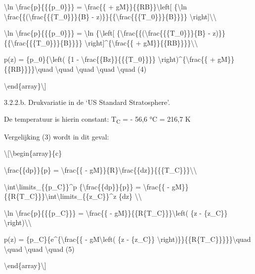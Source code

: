 \documentclass[]{article}
\begin{document}
\textbackslash{}ln \textbackslash{}frac\{p\}\{\{\{p\_0\}\}\} =
\textbackslash{}frac\{\{ + gM\}\}\{\{RB\}\}\textbackslash{}left{[}
\{\textbackslash{}ln
\textbackslash{}frac\{\{(\textbackslash{}frac\{\{\{T\_0\}\}\}\{B\} -
z)\}\}\{\{\textbackslash{}frac\{\{\{T\_0\}\}\}\{B\}\}\}\}
\textbackslash{}right{]}\textbackslash{}\textbackslash{}

\textbackslash{}ln \textbackslash{}frac\{p\}\{\{\{p\_0\}\}\} =
\textbackslash{}ln \{\textbackslash{}left{[}
\{\textbackslash{}frac\{\{(\textbackslash{}frac\{\{\{T\_0\}\}\}\{B\} -
z)\}\}\{\{\textbackslash{}frac\{\{\{T\_0\}\}\}\{B\}\}\}\}
\textbackslash{}right{]}\^{}\{\textbackslash{}frac\{\{ +
gM\}\}\{\{RB\}\}\}\}\textbackslash{}\textbackslash{}

p(z) = \{p\_0\}\{\textbackslash{}left( \{1 -
\textbackslash{}frac\{\{Bz\}\}\{\{\{T\_0\}\}\}\}
\textbackslash{}right)\^{}\{\textbackslash{}frac\{\{ +
gM\}\}\{\{RB\}\}\}\}\textbackslash{}quad \textbackslash{}quad
\textbackslash{}quad \textbackslash{}quad \textbackslash{}quad (4)

\textbackslash{}end\{array\}\textbackslash{}{]}

3.2.2.b. Drukvariatie in de `US Standard Stratosphere'.

De temperatuur is hierin constant: T\textsubscript{C} = - 56,6 °C =
216,7 K

Vergelijking (3) wordt in dit geval:

\textbackslash{}{[}\textbackslash{}begin\{array\}\{c\}

\textbackslash{}frac\{\{dp\}\}\{p\} = \textbackslash{}frac\{\{ -
gM\}\}\{R\}\textbackslash{}frac\{\{dz\}\}\{\{\{T\_C\}\}\}\textbackslash{}\textbackslash{}

\textbackslash{}int\textbackslash{}limits\_\{\{p\_C\}\}\^{}p
\{\textbackslash{}frac\{\{dp\}\}\{p\}\} = \textbackslash{}frac\{\{ -
gM\}\}\{\{R\{T\_C\}\}\}\textbackslash{}int\textbackslash{}limits\_\{\{z\_C\}\}\^{}z
\{dz\} \textbackslash{}\textbackslash{}

\textbackslash{}ln \textbackslash{}frac\{p\}\{\{\{p\_C\}\}\} =
\textbackslash{}frac\{\{ - gM\}\}\{\{R\{T\_C\}\}\}\textbackslash{}left(
\{z - \{z\_C\}\} \textbackslash{}right)\textbackslash{}\textbackslash{}

p(z) = \{p\_C\}\{e\^{}\{\textbackslash{}frac\{\{ -
gM\textbackslash{}left( \{z - \{z\_C\}\}
\textbackslash{}right)\}\}\{\{R\{T\_C\}\}\}\}\}\textbackslash{}quad
\textbackslash{}quad \textbackslash{}quad \textbackslash{}quad (5)

\textbackslash{}end\{array\}\textbackslash{}{]}
\end{document}

